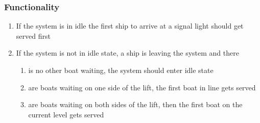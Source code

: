 \subsubsection*{Functionality}
\begin{enumerate}
	\item If the system is in idle the first ship to arrive at a signal light should get served first
	\item If the system is not in idle state, a ship is leaving the system and there
	\begin{enumerate}
		\item is no other boat waiting, the system should enter idle state
		\item are boats waiting on one side of the lift, the first boat in line gets served 
		\item are boats waiting on both sides of the lift, then the first boat on the current level gets served
	\end{enumerate}
\end{enumerate}
